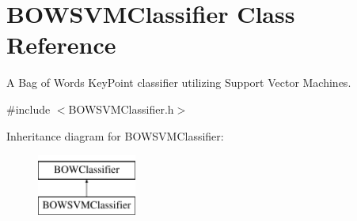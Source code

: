 \hypertarget{classBOWSVMClassifier}{
\section{BOWSVMClassifier Class Reference}
\label{classBOWSVMClassifier}
}


A Bag of Words KeyPoint classifier utilizing Support Vector Machines.  




{\ttfamily \#include $<$BOWSVMClassifier.h$>$}

Inheritance diagram for BOWSVMClassifier:\begin{figure}[H]
\begin{center}
\leavevmode
\includegraphics[height=2cm]{classBOWSVMClassifier}
\end{center}
\end{figure}
